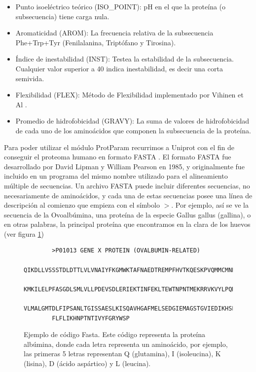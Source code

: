 \begin{itemize}
    \item Punto isoeléctrico teórico (ISO\_POINT): pH en el que la proteína (o subsecuencia) tiene carga nula. 
    \item Aromaticidad (AROM): La frecuencia relativa de la subsecuencia Phe+Trp+Tyr (Fenilalanina, Triptófano y Tirosina). 
    \item Índice de inestabilidad (INST): Testea la estabilidad de la subsecuencia. Cualquier valor superior a 40 indica inestabilidad, es decir una corta semivida.
    \item Flexibilidad (FLEX): Método de Flexibilidad implementado por Vihinen et Al \cite{vihinen1994}.  
    \item Promedio de hidrofobicidad (GRAVY): La suma de valores de hidrofobicidad de cada uno de los aminoácidos que componen la subsecuencia de la proteína.
\end{itemize}

Para poder utilizar el módulo ProtParam recurrimos a Uniprot \cite{uniprot} con el fin de conseguir el proteoma humano en formato FASTA \cite{FASTA}. El formato FASTA fue desarrollado por David Lipman y William Pearson en 1985, y originalmente fue incluido en un programa del mismo nombre utilizado para el alineamiento múltiple de secuencias. Un archivo FASTA puede incluir diferentes secuencias, no necesariamente de aminoácidos, y cada una de estas secuencias posee una línea de descripción al comienzo que empieza con el símbolo $>$. Por ejemplo, así se ve la secuencia de la Ovoalbúmina, una proteína de la especie Gallus gallus (gallina), o en otras palabras, la principal proteína que encontramos en la clara de los huevos (ver figura \ref{code:fasta_code})

\begin{figure}
    \begin{verbatim}
    	>P01013 GENE X PROTEIN (OVALBUMIN-RELATED)
    	QIKDLLVSSSTDLDTTLVLVNAIYFKGMWKTAFNAEDTREMPFHVTKQESKPVQMMCMNNSFNVATLPAE
    	KMKILELPFASGDLSMLVLLPDEVSDLERIEKTINFEKLTEWTNPNTMEKRRVKVYLPQMKIEEKYNLTS
    	VLMALGMTDLFIPSANLTGISSAESLKISQAVHGAFMELSEDGIEMAGSTGVIEDIKHSPESEQFRADHP
    	FLFLIKHNPTNTIVYFGRYWSP
    \end{verbatim}
\caption{Ejemplo de código Fasta. Este código representa la proteína albúmina, donde cada letra representa un aminoácido, por ejemplo, las primeras 5 letras representan Q (glutamina), I (isoleucina), K (lisina), D (ácido aspártico) y L (leucina).}
\label{code:fasta_code}

\end{figure}
\pagebreak

